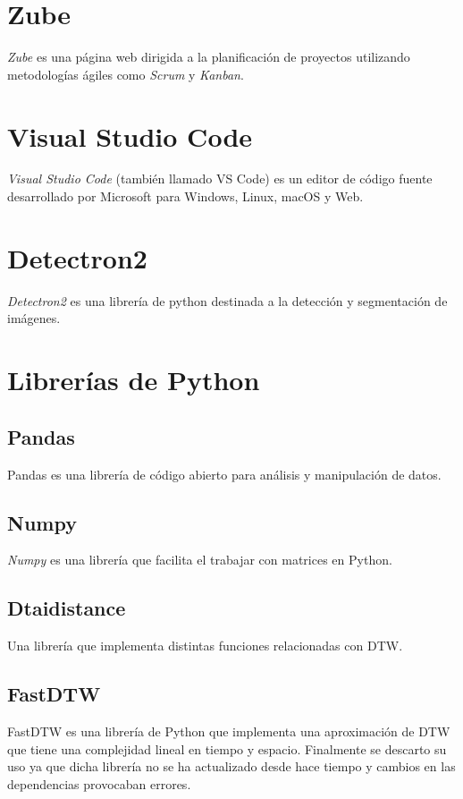 \section{Zube}
\textit{Zube} es una página web dirigida a la planificación de proyectos utilizando metodologías ágiles como \textit{Scrum} y \textit{Kanban}.

\section{Visual Studio Code}
\textit{Visual Studio Code} (también llamado VS Code) es un editor de código fuente desarrollado por Microsoft para Windows, Linux, macOS y Web. \cite{wiki:visualstudiocode}



\section{Detectron2}
\textit{Detectron2} es una librería de python destinada a la detección y segmentación de imágenes. 

\section{Librerías de Python}
\subsection{Pandas}
Pandas es una librería de código abierto para análisis y manipulación de datos. \cite{pandas}

\subsection{Numpy}
\textit{Numpy} es una librería que facilita el trabajar con matrices en Python.

\subsection{Dtaidistance}
Una librería que implementa distintas funciones relacionadas con DTW.

\subsection{FastDTW}
FastDTW es una librería de Python  que implementa una aproximación de DTW que tiene una complejidad lineal en tiempo y espacio. \cite{Salvador2004FastDTWTA}
Finalmente se descarto su uso ya que dicha librería no se ha actualizado desde hace tiempo y cambios en las dependencias provocaban errores.

